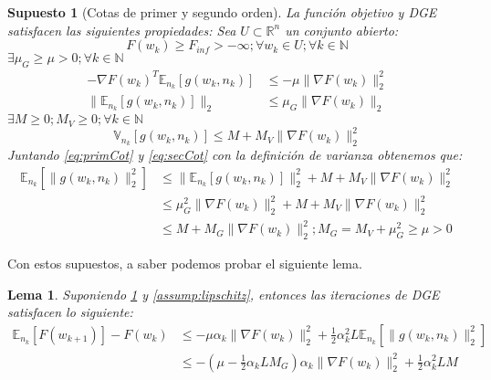 \documentclass{book}
\theoremstyle{plain}
\newtheorem{lem}[thm]{Lema}
\newtheorem{assump}{Supuesto}[thm]
\theoremstyle{definition}
\theoremstyle{remark}
\begin{document}
\begin{assump}[Cotas de primer y segundo orden]\label{assump:primeSec}
La función objetivo y DGE satisfacen las siguientes propiedades: Sea $U\subset\mathbb{R}^n$ un conjunto abierto:
\begin{equation}\label{eq:cotInf}
    F(w_k)\geq F_{inf} > -\infty; \forall w_k \in U;\forall k\in\mathbb{N}
\end{equation}
$\exists \mu_G \geq \mu>0; \forall k \in \mathbb{N}$
\begin{equation}\label{eq:primCot}
\begin{split}
    -\nabla F(w_k)^T\mathbb{E}_{n_k}[g(w_k, n_k)] & \leq -\mu\|\nabla F(w_k)\|_2^2 \\
    \|\mathbb{E}_{n_k}[g(w_k, n_k)]\|_2 & \leq \mu_G\|\nabla F(w_k)\|_2
\end{split}
\end{equation}
$\exists M \geq 0;  M_V\geq0; \forall k \in \mathbb{N}$
\begin{equation}\label{eq:secCot}
    \mathbb{V}_{n_k}[g(w_k, n_k)] \leq M + M_V\|\nabla F(w_k)\|_2^2
\end{equation}
Juntando \ref{eq:primCot} y \ref{eq:secCot} con la definición de varianza obtenemos que: 
\begin{equation}\label{eq:secCot1}
    \begin{split}
    \mathbb{E}_{n_k}[\|g(w_k, n_k)\|_2^2] & \leq \|\mathbb{E}_{n_k}[g(w_k, n_k)]\|_2^2 + M + M_V\|\nabla F(w_k)\|_2^2\\
    & \leq \mu_G^2\|\nabla F(w_k)\|_2^2 + M + M_V\|\nabla F(w_k)\|_2^2\\
    & \leq M + M_G\|\nabla F(w_k)\|_2^2; M_G = M_V + \mu_G^2 \geq \mu >0
    \end{split}
\end{equation}
\end{assump}

Con estos supuestos, a saber podemos probar el siguiente lema. 

\begin{lem}\label{lem:desc}
Suponiendo \ref{assump:primeSec} y \ref{assump:lipschitz}, entonces las iteraciones de DGE satisfacen lo siguiente: 
\begin{equation}
    \begin{split}
    \mathbb{E}_{n_k}[F(w_{k+1})] - F(w_k) & \leq -\mu\alpha_k\|\nabla F(w_k)\|^2_2 + \frac{1}{2}\alpha_k^2L\mathbb{E}_{n_k}[\|g(w_k, n_k)\|_2^2]\\
    & \leq -(\mu - \frac{1}{2}\alpha_kLM_G)\alpha_k\|\nabla F(w_k)\|_2^2 + \frac{1}{2}\alpha_k^2LM
    \end{split}
\end{equation}
\end{lem}
\end{document}
